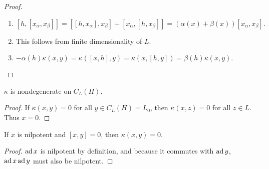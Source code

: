 \documentclass[twoside, 10pt]{article}
\begin{document}
    \begin{proof} \begin{enumerate} \item $ [h,[x_{\alpha},x_{\beta}]] =
        [[h,x_{\alpha}],x_{\beta}] + [x_{\alpha}, [h,x_{\beta}]] = (\alpha(x) +
        \beta(x))[x_{\alpha},x_{\beta}].$ \item This follows from finite
        dimensionality of $L$.  \item $ -\alpha(h)\kappa(x,y) = \kappa([x,h],y)
        = \kappa(x,[h,y]) = \beta(h) \kappa(x,y).$ \qedhere \end{enumerate}
        \end{proof}

    \begin{cor} $\kappa$ is nondegenerate on $C_L(H)$.  \end{cor}

    \begin{proof} If $\kappa(x,y) = 0$ for all $y \in C_L(H) = L_0$, then
    $\kappa(x,z) = 0$ for all $z \in L$. Thus $x = 0$.  \end{proof}

    \begin{lem} If $x$ is nilpotent and $[x,y] = 0$, then $\kappa(x,y) = 0$.
    \end{lem}

    \begin{proof} $\operatorname{ad} x$ is nilpotent by definition, and because it commutes
    with $\operatorname{ad} y$, $\operatorname{ad} x \operatorname{ad} y$ must also be nilpotent.  \end{proof}
\end{document}
